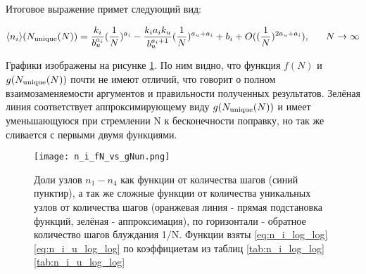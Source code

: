 Итоговое выражение примет следующий вид:

\begin{large}
\begin{equation}
\langle n_i \rangle (N_{\textup{unique}}(N)) = \frac{k_i}{b_u^{a_i}} (\frac{1}{N})^{a_i} - \frac{k_i a_i k_u}{b_u^{a_i+1}} (\frac{1}{N})^{a_u+a_i} + b_i + O((\frac{1}{N})^{2 a_u +a_i}),\ \ \ \ \ N \to \infty
\end{equation}
\label{g_n_expect}
\end{large}

Графики изображены на рисунке \ref{fig:ni_fn_vs_gNun}. По ним видно, что функция $f(N)$ и $g(N_{\textup{unique}}(N))$ почти не имеют отличий, что говорит о полном взаимозаменяемости аргументов и правильности полученных результатов. Зелёная линия соответствует аппроксимирующему виду $g(N_{\textup{unique}}(N))$ и имеет уменьшающуюся при стремлении N к бесконечности поправку, но так же сливается с первыми двумя функциями.

\begin{figure}
\centering
\texttt{[image: n\_i\_fN\_vs\_gNun.png]}
\label{fig:ni_fn_vs_gNun}
\caption{Доли узлов $n_1-n_4$ как функции от количества шагов (синий пунктир), а так же сложные функции от количества уникальных узлов от количества шагов (оранжевая линия - прямая подстановка функций, зелёная - аппроксимация), по горизонтали - обратное количество шагов блуждания 1/N. Функции взяты \ref{eq:n_i_log_log} \ref{eq:n_i_u_log_log} по коэффициетам из таблиц \ref{tab:n_i_log_log} \ref{tab:n_i_u_log_log}}
\end{figure}
